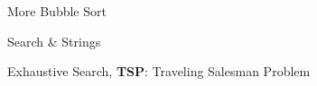 \documentclass[12pt,a4paper]{article}
\begin{document}
    \begin{figure}[!hbtp]
        \centering
        \caption{More Bubble Sort}
    \end{figure}

    \begin{figure}[!hbtp]
        \centering
        \caption{Search \& Strings}
    \end{figure}

    \begin{figure}[!hbtp]
        \centering
        \caption{Exhaustive Search, \textbf{TSP}: Traveling Salesman Problem}
    \end{figure}
\end{document}
